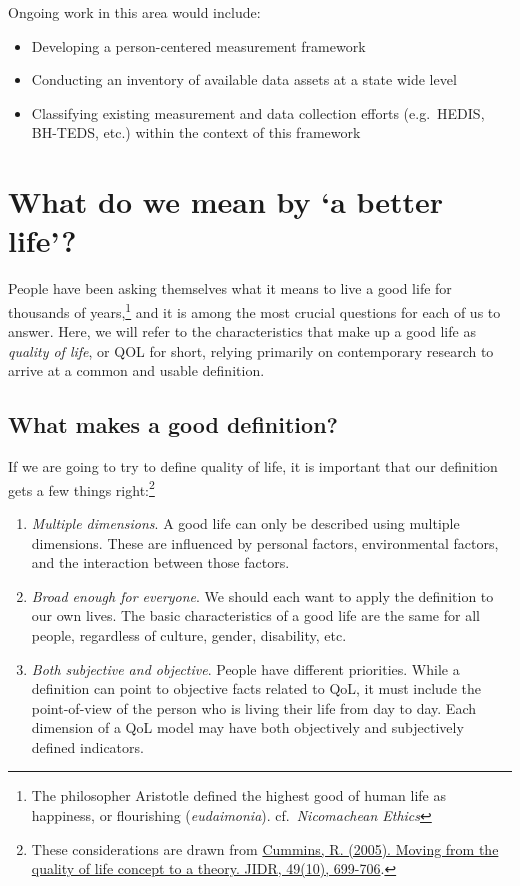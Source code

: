 \documentclass[
]{book}
\providecommand{\tightlist}{%
  \setlength{\itemsep}{0pt}\setlength{\parskip}{0pt}}
\begin{document}
Ongoing work in this area would include:

\begin{itemize}
\tightlist
\item
  Developing a person-centered measurement framework
\item
  Conducting an inventory of available data assets at a state wide level
\item
  Classifying existing measurement and data collection efforts (e.g.~HEDIS, BH-TEDS, etc.) within the context of this framework
\end{itemize}

\hypertarget{what-do-we-mean-by-a-better-life}{%
\section{What do we mean by `a better life'?}\label{what-do-we-mean-by-a-better-life}}

People have been asking themselves what it means to live a good life for thousands of years,\footnote{The philosopher Aristotle defined the highest good of human life as happiness, or flourishing (\emph{eudaimonia}). cf.~\emph{Nicomachean Ethics}} and it is among the most crucial questions for each of us to answer. Here, we will refer to the characteristics that make up a good life as \emph{quality of life}, or QOL for short, relying primarily on contemporary research to arrive at a common and usable definition.

\hypertarget{what-makes-a-good-definition}{%
\subsection{What makes a good definition?}\label{what-makes-a-good-definition}}

If we are going to try to define quality of life, it is important that our definition gets a few things right:\footnote{These considerations are drawn from \href{https://www.ncbi.nlm.nih.gov/pubmed/16162114}{Cummins, R. (2005). Moving from the quality of life concept to a theory. JIDR, 49(10), 699-706}.}

\begin{enumerate}
\def\labelenumi{\arabic{enumi}.}
\tightlist
\item
  \emph{Multiple dimensions}. A good life can only be described using multiple dimensions. These are influenced by personal factors, environmental factors, and the interaction between those factors.
\item
  \emph{Broad enough for everyone}. We should each want to apply the definition to our own lives. The basic characteristics of a good life are the same for all people, regardless of culture, gender, disability, etc.
\item
  \emph{Both subjective and objective}. People have different priorities. While a definition can point to objective facts related to QoL, it must include the point-of-view of the person who is living their life from day to day. Each dimension of a QoL model may have both objectively and subjectively defined indicators.
\end{enumerate}
\end{document}
